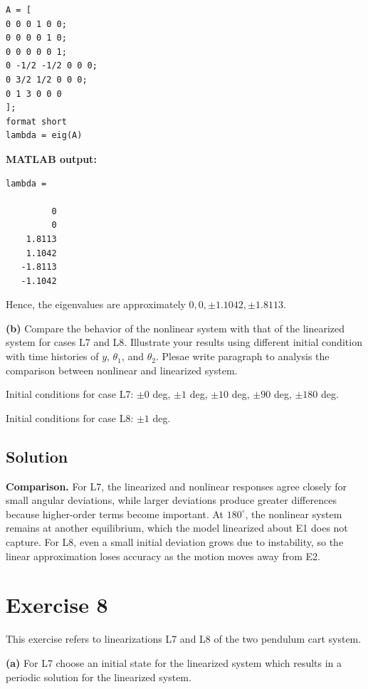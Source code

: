 \documentclass[12pt,a4paper]{article}
\begin{document}
\begin{lstlisting}
A = [
0 0 0 1 0 0;
0 0 0 0 1 0;
0 0 0 0 0 1;
0 -1/2 -1/2 0 0 0;
0 3/2 1/2 0 0 0;
0 1 3 0 0 0
];
format short
lambda = eig(A)
\end{lstlisting}

\textbf{MATLAB output:}
\begin{lstlisting}[language={}]
lambda =

         0
         0
    1.8113
    1.1042
   -1.8113
   -1.1042
\end{lstlisting}
Hence, the eigenvalues are approximately $0,0,\pm1.1042,\pm1.8113$.

\vspace{0.3cm}

\clearpage
\textbf{(b)} Compare the behavior of the nonlinear system with that of the linearized system for cases L7 and L8. Illustrate your results using different initial condition with time histories of $y$, $\theta_1$, and $\theta_2$. Plesae write paragraph to analysis the comparison between nonlinear and linearized system.

Initial conditions for case L7: $\pm0$ deg, $\pm1$ deg, $\pm10$ deg, $\pm90$ deg, $\pm180$ deg.

Initial conditions for case L8: $\pm1$ deg.
\subsection*{Solution}
\par\medskip
\textbf{Comparison.}
For L7, the linearized and nonlinear responses agree closely for small
angular deviations, while larger deviations produce greater differences
because higher-order terms become important. At $180^\circ$, the nonlinear
system remains at another equilibrium, which the model linearized about E1
does not capture. For L8, even a small initial deviation grows due to
instability, so the linear approximation loses accuracy as the motion
moves away from E2.




\clearpage
\section*{Exercise 8}
This exercise refers to linearizations L7 and L8 of the two pendulum cart system.

\textbf{(a)} For L7 choose an initial state for the linearized system which results in a periodic solution for the linearized system.
\end{document}
